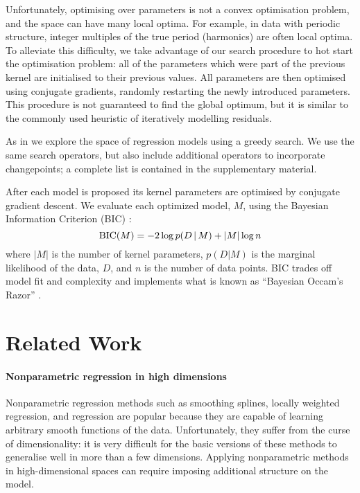 Unfortunately, optimising over parameters is not a convex optimisation problem, and the space can have many local optima.
For example, in data with periodic structure, integer multiples of the true period (\ie harmonics) are often local optima. 
To alleviate this difficulty, we take advantage of our search procedure to hot start the optimisation problem: all of the parameters which were part of the previous kernel are initialised to their previous values.
All parameters are then optimised using conjugate gradients, randomly restarting the newly introduced parameters.
This procedure is not guaranteed to find the global optimum, but it is similar to the commonly used heuristic of iteratively modelling residuals.


As in \citet{DuvLloGroetal13} we explore the space of regression models using a greedy search.
We use the same search operators, but also include additional operators to incorporate changepoints; a complete list is contained in the supplementary material. 

After each model is proposed its kernel parameters are optimised by conjugate gradient descent.
We evaluate each optimized model, $M$, using the Bayesian Information Criterion (BIC) \citep{schwarz1978estimating}:
\begin{equation}
\textrm{BIC}(M) = -2 \log p(D\,|\, M) + |M| \log n
\end{equation}
where $|M|$ is the number of kernel parameters, $p(D|M)$ is the marginal likelihood of the data, $D$, and $n$ is the number of data points.
BIC trades off model fit and complexity and implements what is known as ``Bayesian Occam's Razor'' \citep[e.g.][]{rasmussen2001occam,mackay2003information}.

\section{Related Work}
\label{sec:construction:related_work}

\paragraph{Nonparametric regression in high dimensions}
Nonparametric regression methods such as smoothing splines, locally weighted regression, and \gp{} regression are popular because they are capable of learning arbitrary smooth functions of the data.
Unfortunately, they suffer from the curse of dimensionality: it is very difficult for the basic versions of these methods to generalise well in more than a few dimensions.
Applying nonparametric methods in high-dimensional spaces can require imposing additional structure on the model.

